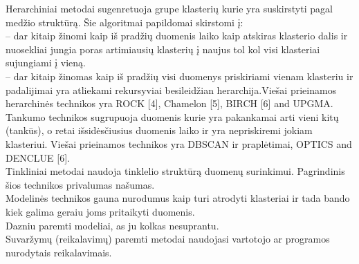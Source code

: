 \documentclass{VUMIFInfKursinis}
\begin{document}
Herarchiniai metodai sugenretuoja  grupe klasterių kurie yra suskirstyti pagal medžio struktūrą. Šie algoritmai papildomai skirstomi į:\\
	 – dar kitaip žinomi kaip  iš pradžių duomenis laiko kaip atskiras klasterio dalis ir nuosekliai jungia poras artimiausių klasterių į naujus tol kol visi klasteriai sujungiami į vieną.\\
	 – dar kitaip žinomas kaip  iš pradžių visi duomenys priskiriami vienam klasteriu ir padalijimai yra atliekami rekursyviai besileidžian herarchija.Viešai prieinamos herarchinės technikos yra ROCK [4], Chamelon [5], BIRCH [6] and UPGMA. \\
	Tankumo technikos sugrupuoja duomenis kurie yra pakankamai arti vieni kitų (tankūs), o retai išsidėsčiusius duomenis laiko  ir yra nepriskiremi jokiam klasteriui. Viešai prieinamos technikos yra DBSCAN ir praplėtimai, OPTICS and DENCLUE [6].\\
	Tinkliniai metodai naudoja  tinklelio struktūrą duomenų surinkimui. Pagrindinis šios technikos privalumas \textendash{} našumas.\\
	Modelinės technikos gauna nurodumus kaip turi atrodyti klasteriai ir tada bando kiek galima geraiu joms pritaikyti duomenis.\\
	Dazniu paremti modeliai, as ju kolkas nesuprantu.\\
Suvaržymų (reikalavimų) paremti metodai naudojasi vartotojo ar programos nurodytais reikalavimais.
\end{document}
